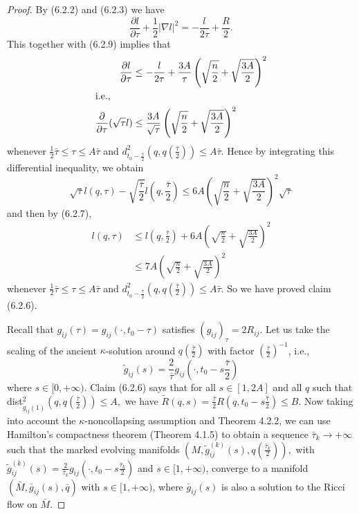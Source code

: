 \begin{proof}
By (6.2.2) and (6.2.3) we have
$$
\frac{\partial l}{\partial \tau}+\frac{1}{2}|\nabla
l|^2=-\frac{l}{2\tau}+\frac{R}{2}.
$$
This together with (6.2.9) implies that
\begin{align*}
\frac{\partial l}{\partial \tau} &\leq
-\frac{l}{2\tau}+\frac{3A}{\tau}
\left(\sqrt{\frac{n}{2}}+\sqrt{\frac{3A}{2}}\right)^2 \\
\intertext{i.e.,} \frac{\partial}{\partial\tau}(\sqrt{\tau}l)
&\leq\frac{3A}{\sqrt{\tau}}\left(\sqrt{\frac{n}{2}}+\sqrt{\frac{3A}{2}}\right)^2
\end{align*}
whenever $\frac{1}{2}\bar{\tau}\leq \tau \leq A\bar{\tau}$ and
$d_{t_0-\frac{\bar{\tau}}{2}}^2
\left(q,q\left(\frac{\bar{\tau}}{2}\right)\right)\leq A\bar{\tau}.$ Hence by
integrating this differential inequality, we obtain
$$
\sqrt{\tau}l(q,\tau)-\sqrt{\frac{\bar{\tau}}{2}}l\left(q,\frac{\bar{\tau}}{2}\right)
\leq 6A\left(\sqrt{\frac{n}{2}}+\sqrt{\frac{3A}{2}}\right)^2\sqrt{\tau}
$$
and then by (6.2.7),
\begin{align}
l(q,\tau)&  \leq
l\left(q,\frac{\bar{\tau}}{2}\right)+6A\left(\sqrt{\frac{n}{2}}+\sqrt{\frac{3A}{2}}\right)^2\\
&  \leq 7A\left(\sqrt{\frac{n}{2}}+\sqrt{\frac{3A}{2}}\right)^2 \nonumber
\end{align}  %
whenever $\frac{1}{2}\bar{\tau}\leq \tau \leq A\bar{\tau}$ and
$d_{t_0-\frac{\bar{\tau}}{2}}^2 (q,q(\frac{\bar{\tau}}{2}))\leq
A\bar{\tau}.$  So we have proved claim (6.2.6).

Recall that $g_{ij}(\tau)=g_{ij}(\cdot,t_0-\tau) $ satisfies
$(g_{ij})_\tau=2R_{ij}$. Let us take the scaling of the ancient
$\kappa$-solution around $q(\frac{\bar{\tau}}{2})$ with factor
$(\frac{\bar{\tau}}{2})^{-1}$, i.e.,
$$
\tilde{g}_{ij}(s)=\frac{2}{\bar{\tau}}g_{ij}
\left(\cdot,t_0-s\frac{\bar{\tau}}{2}\right)
$$
where $s\in [0,+\infty)$. Claim (6.2.6) says that for all
$s\in[1,2A]$ and all $q$ such that
dist$^2_{\tilde{g}_{ij}(1)}(q,q(\frac{\bar{\tau}}{2}))\leq A,$ we
have $\tilde{R}(q,s)=\frac{\bar
\tau}{2}R(q,t_0-s\bar{\frac{\tau}{2}})\leq B$. Now taking into
account the $\kappa$-noncollapsing assumption and Theorem 4.2.2,
we can use Hamilton's compactness theorem (Theorem 4.1.5) to
obtain a sequence $\bar{\tau}_k\rightarrow +\infty$ such that the
marked evolving manifolds
$(M,\tilde{g}_{ij}^{(k)}(s),q(\frac{\bar{\tau}_k}{2})),$ with
$\tilde{g}_{ij}^{(k)}(s)=\frac{2}{\bar{\tau}_k}g_{ij}
(\cdot,t_0-s\frac{\bar{\tau}_k}{2})$ and $s \in [1,+\infty)$,
converge to a manifold $(\bar{M},\bar{g}_{ij}(s),\bar{q})$ with $s
\in [1,+\infty)$, where $\bar{g}_{ij}(s)$ is also a solution to
the Ricci flow on $\bar{M}$.


\end{proof}
